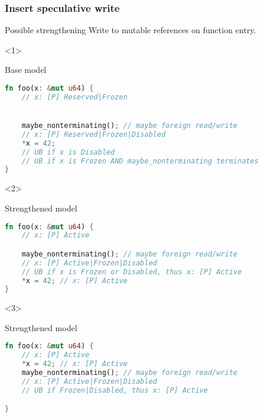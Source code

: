 \begin{frame}[fragile, t]
    \frametitle{Insert speculative write}

    \begin{exampleblock}{Possible strengthening}
        Write to mutable references on function entry.
    \end{exampleblock}

    \begin{onlyenv}<1>
        \begin{block}{{\xmark} Base model}
            \begin{lstlisting}[language=rust, basicstyle=\ttfamily\scriptsize]
fn foo(x: &mut u64) {
    // x: [P] Reserved|Frozen


    maybe_nonterminating(); // maybe foreign read/write
    // x: [P] Reserved|Frozen|Disabled
    *x = 42;
    // UB if x is Disabled
    // UB if x is Frozen AND maybe_nonterminating terminates
}
            \end{lstlisting}
        \end{block}
    \end{onlyenv}

    \begin{onlyenv}<2>
        \begin{block}{{\cmark} Strengthened model}
            \begin{lstlisting}[language=rust, basicstyle=\ttfamily\scriptsize]
fn foo(x: &mut u64) {
    // x: [P] Active

    maybe_nonterminating(); // maybe foreign read/write
    // x: [P] Active|Frozen|Disabled
    // UB if x is Frozen or Disabled, thus x: [P] Active
    *x = 42; // x: [P] Active
}
            \end{lstlisting}
        \end{block}
    \end{onlyenv}

    \begin{onlyenv}<3>
        \begin{block}{{\cmark} Strengthened model}
            \begin{lstlisting}[language=rust, basicstyle=\ttfamily\scriptsize]
fn foo(x: &mut u64) {
    // x: [P] Active
    *x = 42; // x: [P] Active
    maybe_nonterminating(); // maybe foreign read/write
    // x: [P] Active|Frozen|Disabled
    // UB if Frozen|Disabled, thus x: [P] Active

}
            \end{lstlisting}
        \end{block}
    \end{onlyenv}


\end{frame}
